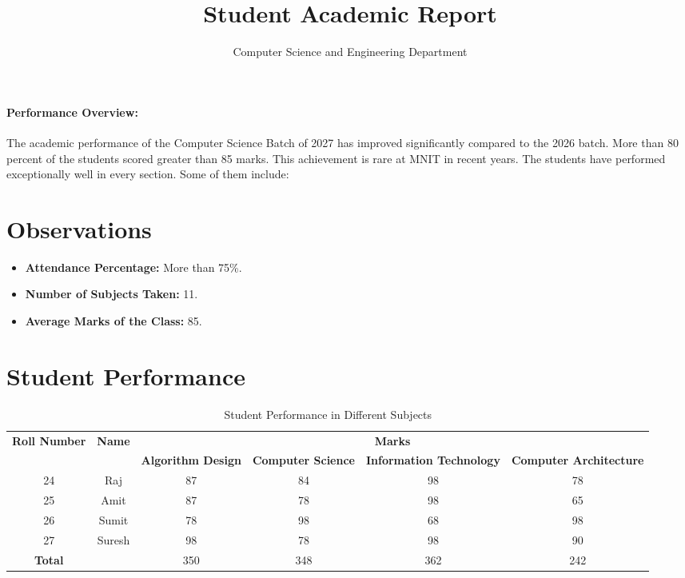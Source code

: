\documentclass[a4paper,12pt]{article}
\title{\Large \textbf{Student Academic Report}}
\author{Computer Science and Engineering Department}
\date{}  %
\begin{document}
	
	\maketitle
	
	\paragraph*{Performance Overview:} 
	The academic performance of the Computer Science Batch of 2027 has improved significantly compared to the 2026 batch. More than 80 percent of the students scored greater than 85 marks. This achievement is rare at MNIT in recent years. The students have performed exceptionally well in every section. Some of them include:
	
	\section*{Observations}
	\begin{itemize}
		\item \textbf{Attendance Percentage:} More than 75\%.
		\item \textbf{Number of Subjects Taken:} 11.
		\item \textbf{Average Marks of the Class:} 85.
	\end{itemize}
	
	\section*{Student Performance}
	\begin{table}[h]
		\centering
		\small  %
		\begin{tabular}{|c|c|c|c|c|c|}
			\hline
			\multirow{2}{*}{\textbf{Roll Number}} & \multirow{2}{*}{\textbf{Name}} & \multicolumn{4}{|c|}{\textbf{Marks}} \\
			\cline{3-6}
			&  & \textbf{Algorithm Design} & \textbf{Computer Science} & \textbf{Information Technology} & \textbf{Computer Architecture} \\
			\hline
			24 & Raj & 87 & 84 & 98 & 78 \\
			\hline
			25 & Amit & 87 & 78 & 98 & 65 \\
			\hline
			26 & Sumit & 78 & 98 & 68 & 98 \\
			\hline
			27 & Suresh & 98 & 78 & 98 & 90 \\
			\hline
			\textbf{Total} & & 350 & 348 & 362 & 242 \\
			\hline
		\end{tabular}
		\caption{Student Performance in Different Subjects}
	\end{table}
	
\end{document}

